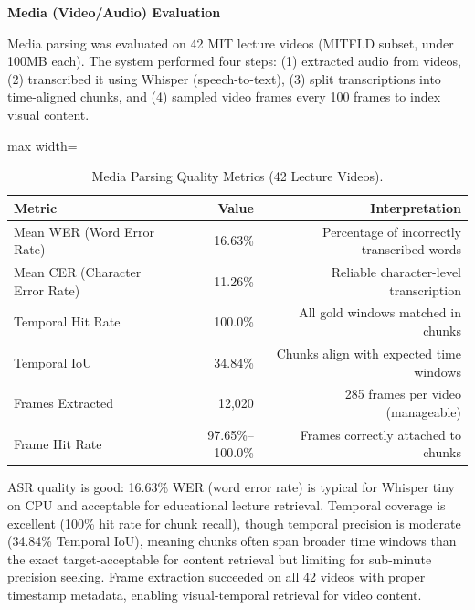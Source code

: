 \textbf{Media (Video/Audio) Evaluation}

Media parsing was evaluated on 42 MIT lecture videos (MITFLD subset, under 100MB each). The system performed four steps: (1) extracted audio from videos, (2) transcribed it using Whisper (speech-to-text), (3) split transcriptions into time-aligned chunks, and (4) sampled video frames every 100 frames to index visual content.

\begin{table}[H]
    \centering
    \caption{Media Parsing Quality Metrics (42 Lecture Videos).}
    \label{tab:media_results}
    \begin{adjustbox}{max width=\linewidth}
    \begin{tabular}{lrr}
        \toprule
        \textbf{Metric} & \textbf{Value} & \textbf{Interpretation} \\
        \midrule
        Mean WER (Word Error Rate) & 16.63\% & Percentage of incorrectly transcribed words \\
        Mean CER (Character Error Rate) & 11.26\% & Reliable character-level transcription \\
        Temporal Hit Rate & 100.0\%\footnotemark & All gold windows matched in chunks \\
        Temporal IoU & 34.84\% & Chunks align with expected time windows \\
        Frames Extracted & 12,020 & 285 frames per video (manageable) \\
        Frame Hit Rate & 97.65\%--100.0\% & Frames correctly attached to chunks \\
        \bottomrule
    \end{tabular}
\end{adjustbox}
\end{table}

ASR quality is good: 16.63\% WER (word error rate) is typical for Whisper tiny on CPU and acceptable for educational lecture retrieval. Temporal coverage is excellent (100\% hit rate for chunk recall), though temporal precision is moderate (34.84\% Temporal IoU), meaning chunks often span broader time windows than the exact target-acceptable for content retrieval but limiting for sub-minute precision seeking. Frame extraction succeeded on all 42 videos with proper timestamp metadata, enabling visual-temporal retrieval for video content.


